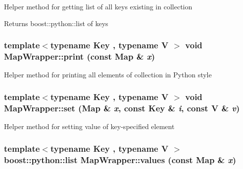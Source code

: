 \label{struct_stl_containers_wrappers_1_1_map_wrapper_ac77b18022558a701e72fef0c590a30e5}
Helper method for getting list of all keys existing in collection \begin{DoxyReturn}{Returns}
boost::python::list of keys 
\end{DoxyReturn}
\hypertarget{struct_stl_containers_wrappers_1_1_map_wrapper_ac055a7e3c344719ff196cc1d146da0a1}{
\subsubsection[{print}]{\setlength{\rightskip}{0pt plus 5cm}template$<$typename Key , typename V $>$ void MapWrapper::print (const Map \& {\em x})}}
\label{struct_stl_containers_wrappers_1_1_map_wrapper_ac055a7e3c344719ff196cc1d146da0a1}
Helper method for printing all elements of collection in Python style \hypertarget{struct_stl_containers_wrappers_1_1_map_wrapper_a96ea8db6b3798552ac56ba3528338ed1}{
\subsubsection[{set}]{\setlength{\rightskip}{0pt plus 5cm}template$<$typename Key , typename V $>$ void MapWrapper::set (Map \& {\em x}, \/  const Key \& {\em i}, \/  const V \& {\em v})}}
\label{struct_stl_containers_wrappers_1_1_map_wrapper_a96ea8db6b3798552ac56ba3528338ed1}
Helper method for setting value of key-\/specified element \hypertarget{struct_stl_containers_wrappers_1_1_map_wrapper_af5fe4cddbd02adae4a550258a397e6a0}{
\subsubsection[{values}]{\setlength{\rightskip}{0pt plus 5cm}template$<$typename Key , typename V $>$ boost::python::list MapWrapper::values (const Map \& {\em x})}}
